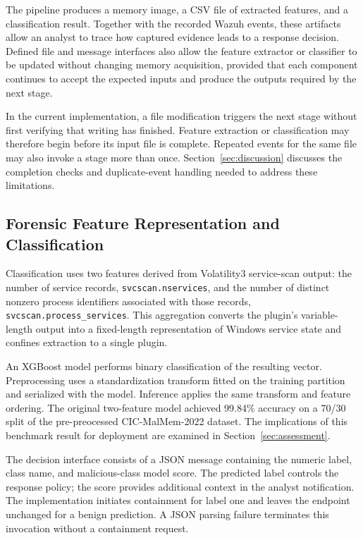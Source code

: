 \documentclass[conference]{IEEEtran}
\begin{document}
The pipeline produces a memory image, a CSV file of extracted features, and a classification result. Together with the recorded Wazuh events, these artifacts allow an analyst to trace how captured evidence leads to a response decision. Defined file and message interfaces also allow the feature extractor or classifier to be updated without changing memory acquisition, provided that each component continues to accept the expected inputs and produce the outputs required by the next stage.

In the current implementation, a file modification triggers the next stage without first verifying that writing has finished. Feature extraction or classification may therefore begin before its input file is complete. Repeated events for the same file may also invoke a stage more than once. Section~\ref{sec:discussion} discusses the completion checks and duplicate-event
handling needed to address these limitations.


\subsection{Forensic Feature Representation and Classification}
Classification uses two features derived from Volatility3 service-scan output: the number of service records, \texttt{svcscan.nservices}, and the number of distinct nonzero process identifiers associated with those records, \texttt{svcscan.process\_services}. This aggregation converts the plugin's variable-length output into a fixed-length representation of Windows service state and confines extraction to a single plugin.

An XGBoost model performs binary classification of the resulting vector. Preprocessing uses a standardization transform fitted on the training partition and serialized with the model. Inference applies the same transform and feature ordering. The original two-feature model achieved 99.84\% accuracy on a 70/30 split of the pre-preocessed CIC-MalMem-2022 dataset. The implications of this benchmark result for deployment are examined in Section~\ref{sec:assessment}.

The decision interface consists of a JSON message containing the numeric label, class name, and malicious-class model score. The predicted label controls the response policy; the score provides additional context in the analyst notification. The implementation initiates containment for label one and leaves the endpoint unchanged for a benign prediction. A JSON parsing failure terminates this invocation without a containment request.
\end{document}
